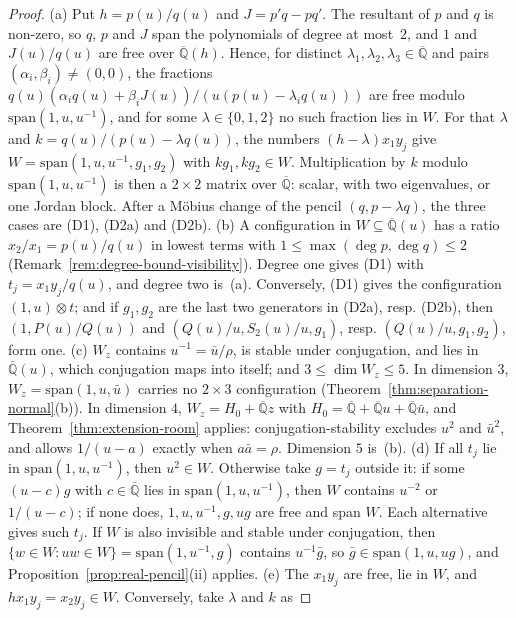 \documentclass[11pt,a4paper]{article}
\theoremstyle{plain}
\theoremstyle{definition}
\newcommand{\Alg}{\overline{\mathbb{Q}}}
\begin{document}
\begin{proof}
(a) Put $h=p(u)/q(u)$ and $J=p'q-pq'$. The resultant of $p$ and $q$ is non-zero, so $q$, $p$ and $J$ span the
polynomials of degree at most~$2$, and $1$ and $J(u)/q(u)$ are free over $\Alg(h)$. Hence, for distinct
$\lambda_{1},\lambda_{2},\lambda_{3}\in\Alg$ and pairs $(\alpha_{i},\beta_{i})\neq(0,0)$, the fractions
$q(u)(\alpha_{i}q(u)+\beta_{i}J(u))/(u(p(u)-\lambda_{i}q(u)))$ are free modulo $\mathrm{span}(1,u,u^{-1})$, and for some
$\lambda\in\{0,1,2\}$ no such fraction lies in $W$. For that $\lambda$ and $k=q(u)/(p(u)-\lambda q(u))$, the numbers
$(h-\lambda)x_{1}y_{j}$ give $W=\mathrm{span}(1,u,u^{-1},g_{1},g_{2})$ with $kg_{1},kg_{2}\in W$. Multiplication by $k$
modulo $\mathrm{span}(1,u,u^{-1})$ is then a $2\times2$ matrix over $\Alg$: scalar, with two eigenvalues, or one Jordan
block. After a M\"obius change of the pencil $(q,p-\lambda q)$, the three cases are (D1), (D2a) and (D2b).
(b) A configuration in $W\subseteq\Alg(u)$ has a ratio $x_{2}/x_{1}=p(u)/q(u)$ in lowest terms with
$1\le\max(\deg p,\deg q)\le2$ (Remark~\ref{rem:degree-bound-visibility}). Degree one gives (D1) with
$t_{j}=x_{1}y_{j}/q(u)$, and degree two is~(a). Conversely, (D1) gives the configuration $(1,u)\otimes t$; and if
$g_{1},g_{2}$ are the last two generators in (D2a), resp. (D2b), then $(1,P(u)/Q(u))$ and
$(Q(u)/u,S_{2}(u)/u,g_{1})$, resp. $(Q(u)/u,g_{1},g_{2})$, form one.
(c) $W_{z}$ contains $u^{-1}=\bar u/\rho$, is stable under conjugation, and lies in $\Alg(u)$, which conjugation maps
into itself; and $3\le\dim W_{z}\le5$. In dimension $3$, $W_{z}=\mathrm{span}(1,u,\bar u)$ carries no $2\times3$
configuration (Theorem~\ref{thm:separation-normal}(b)). In dimension $4$, $W_{z}=H_{0}+\Alg z$ with
$H_{0}=\Alg+\Alg u+\Alg\bar u$, and Theorem~\ref{thm:extension-room} applies: conjugation-stability excludes $u^{2}$
and $\bar u^{2}$, and allows $1/(u-a)$ exactly when $a\bar a=\rho$. Dimension $5$ is~(b).
(d) If all $t_{j}$ lie in $\mathrm{span}(1,u,u^{-1})$, then $u^{2}\in W$. Otherwise take $g=t_{j}$ outside it: if some
$(u-c)g$ with $c\in\Alg$ lies in $\mathrm{span}(1,u,u^{-1})$, then $W$ contains $u^{-2}$ or $1/(u-c)$; if none does,
$1,u,u^{-1},g,ug$ are free and span $W$. Each alternative gives such $t_{j}$. If $W$ is also invisible and stable
under conjugation, then $\{w\in W:uw\in W\}=\mathrm{span}(1,u^{-1},g)$ contains $u^{-1}\bar g$, so
$\bar g\in\mathrm{span}(1,u,ug)$, and Proposition~\ref{prop:real-pencil}(ii) applies.
(e) The $x_{1}y_{j}$ are free, lie in $W$, and $hx_{1}y_{j}=x_{2}y_{j}\in W$. Conversely, take $\lambda$ and $k$ as

\end{proof}
\end{document}
